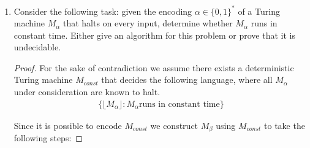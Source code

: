 \documentclass[usletter]{article}
\begin{document}
\begin{enumerate}
    \begin{proof}
      We assume $T$ is computable for the sake of contradiction. Then there exists a Turing machine $M_T$ that computes $T$. Further, there exists a binary string representation $\lfloor M_T \rfloor$ for $M_T$ of bounded length (TODO cite lemma/proof from book?).

      Next we select $n$ of sufficient length such that $T(n)$ must consider a Turing machine $M_{\beta}$ that accommodates the definition of $M_T$ and takes the following steps for an input $x \in \{0,1\}^n$:
      \begin{enumerate}
        \item Simulate $M_T$ on input $n = |x|$, obtaining the maximum running time of all Turing machines $M$ of length $n$.
        \item Write ones to a work tape recording the number written until it exceeds the value of the simulation of $M_T$ with $n$.
      \end{enumerate}

      Now, the result for $n$ must be $T(n) = T_{\beta}(x)$ for $|x| = n$ but then $T_{\beta}(x) > T(|x|)$ by (b), a contradiction.

    \end{proof}

  \item Consider the following task: given the encoding $\alpha \in \{0,1\}^*$ of a Turing machine $M_{\alpha}$ that halts on every input, determine whether $M_{\alpha}$ runs in constant time. Either give an algorithm for this problem or prove that it is undecidable.

      \begin{proof}
        For the sake of contradiction we assume there exists a deterministic Turing machine $M_{const}$ that decides the following language, where all $M_{\alpha}$ under consideration are known to halt.
        \begin{align}
          \{ \lfloor M_{\alpha} \rfloor : M_{\alpha} \text{runs in constant time} \}
        \end{align}

        Since it is possible to encode $M_{const}$ we construct $M_{\beta}$ using $M_{const}$ to take the following steps:


\end{proof}
\end{enumerate}
\end{document}
